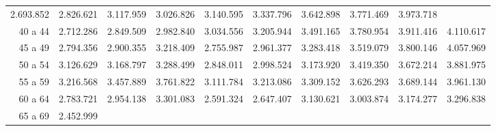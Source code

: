 \begin{tabular}{llllllllll}
  \multicolumn{1}{|r}{2.693.852} &
  \multicolumn{1}{r}{2.826.621} &
  \multicolumn{1}{r}{3.117.959} &
  \multicolumn{1}{r}{3.026.826} &
  \multicolumn{1}{r}{3.140.595} &
  \multicolumn{1}{r}{3.337.796} &
  \multicolumn{1}{r}{3.642.898} &
  \multicolumn{1}{r}{3.771.469} &
  \multicolumn{1}{r}{3.973.718} \\
\multicolumn{1}{r}{40 a 44\hspace{1em}} &
  \multicolumn{1}{|r}{2.712.286} &
  \multicolumn{1}{r}{2.849.509} &
  \multicolumn{1}{r}{2.982.840} &
  \multicolumn{1}{r}{3.034.556} &
  \multicolumn{1}{r}{3.205.944} &
  \multicolumn{1}{r}{3.491.165} &
  \multicolumn{1}{r}{3.780.954} &
  \multicolumn{1}{r}{3.911.416} &
  \multicolumn{1}{r}{4.110.617} \\
\multicolumn{1}{r}{45 a 49\hspace{1em}} &
  \multicolumn{1}{|r}{2.794.356} &
  \multicolumn{1}{r}{2.900.355} &
  \multicolumn{1}{r}{3.218.409} &
  \multicolumn{1}{r}{2.755.987} &
  \multicolumn{1}{r}{2.961.377} &
  \multicolumn{1}{r}{3.283.418} &
  \multicolumn{1}{r}{3.519.079} &
  \multicolumn{1}{r}{3.800.146} &
  \multicolumn{1}{r}{4.057.969} \\
\multicolumn{1}{r}{50 a 54\hspace{1em}} &
  \multicolumn{1}{|r}{3.126.629} &
  \multicolumn{1}{r}{3.168.797} &
  \multicolumn{1}{r}{3.288.499} &
  \multicolumn{1}{r}{2.848.011} &
  \multicolumn{1}{r}{2.998.524} &
  \multicolumn{1}{r}{3.173.920} &
  \multicolumn{1}{r}{3.419.350} &
  \multicolumn{1}{r}{3.672.214} &
  \multicolumn{1}{r}{3.881.975} \\
\multicolumn{1}{r}{55 a 59\hspace{1em}} &
  \multicolumn{1}{|r}{3.216.568} &
  \multicolumn{1}{r}{3.457.889} &
  \multicolumn{1}{r}{3.761.822} &
  \multicolumn{1}{r}{3.111.784} &
  \multicolumn{1}{r}{3.213.086} &
  \multicolumn{1}{r}{3.309.152} &
  \multicolumn{1}{r}{3.626.293} &
  \multicolumn{1}{r}{3.689.144} &
  \multicolumn{1}{r}{3.961.130} \\
\multicolumn{1}{r}{60 a 64\hspace{1em}} &
  \multicolumn{1}{|r}{2.783.721} &
  \multicolumn{1}{r}{2.954.138} &
  \multicolumn{1}{r}{3.301.083} &
  \multicolumn{1}{r}{2.591.324} &
  \multicolumn{1}{r}{2.647.407} &
  \multicolumn{1}{r}{3.130.621} &
  \multicolumn{1}{r}{3.003.874} &
  \multicolumn{1}{r}{3.174.277} &
  \multicolumn{1}{r}{3.296.838} \\
\multicolumn{1}{r}{65 a 69\hspace{1em}} &
  \multicolumn{1}{|r}{2.452.999} &

\end{tabular}

